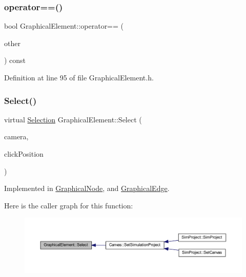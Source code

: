 \subsubsection{\texorpdfstring{operator==()}{operator==()}}
{\footnotesize\ttfamily bool Graphical\+Element\+::operator== (\begin{DoxyParamCaption}\item[{const \hyperlink{class_graphical_element}{Graphical\+Element} \&}]{other }\end{DoxyParamCaption}) const\hspace{0.3cm}{\ttfamily [inline]}}



Definition at line 95 of file Graphical\+Element.\+h.

\mbox{\label{class_graphical_element_a2627b34e57829f942aa00720d9cc8b46}} 
\subsubsection{\texorpdfstring{Select()}{Select()}}
{\footnotesize\ttfamily virtual \hyperlink{struct_selection}{Selection} Graphical\+Element\+::\+Select (\begin{DoxyParamCaption}\item[{const wx\+Affine\+Matrix2D \&}]{camera,  }\item[{wx\+Point2\+D\+Double}]{click\+Position }\end{DoxyParamCaption})\hspace{0.3cm}{\ttfamily [pure virtual]}}



Implemented in \hyperlink{class_graphical_node_ac73e20f3d4c5cca556e0140ef558f6a4}{Graphical\+Node}, and \hyperlink{class_graphical_edge_aa2dbc33d5177ce3aad84f39ba97921de}{Graphical\+Edge}.

Here is the caller graph for this function\+:
\nopagebreak
\begin{figure}[H]
\begin{center}
\leavevmode
\includegraphics[width=350pt]{class_graphical_element_a2627b34e57829f942aa00720d9cc8b46_icgraph}
\end{center}
\end{figure}
\mbox{\label{class_graphical_element_a43627056bafcd65a43eb424dff889e99}} 

